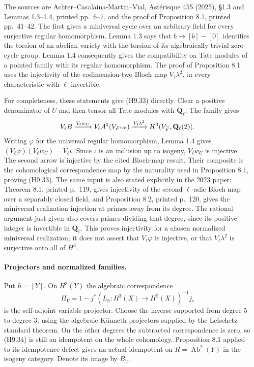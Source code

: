 \documentclass[11pt,a4paper]{article}
\begin{document}
The sources are Achter--Casalaina-Martin--Vial, Ast\'erisque 455 (2025),
\S1.3 and Lemmas 1.3--1.4, printed pp.~6--7, and the proof of
Proposition 8.1, printed pp.~41--42. The first gives a miniversal cycle
over an arbitrary field for every surjective regular homomorphism.
Lemma 1.3 says that $b\mapsto[b]-[0]$ identifies the torsion of an
abelian variety with the torsion of its algebraically trivial zero-cycle
group. Lemma 1.4 consequently gives the compatibility on Tate modules
of a pointed family with its regular homomorphism. The proof of
Proposition 8.1 uses the injectivity of the codimension-two Bloch map
$V_\ell\lambda^2$, in every characteristic with $\ell$ invertible.

For completeness, these statements give (H9.33) directly. Clear a
positive denominator of $U$ and then tensor all Tate modules with
$\mathbf Q_\ell$. The family gives
\[
 V_\ell B\xrightarrow{V_\ell w_U}
 V_\ell A^2(V_{F^{\rm sep}})
 \xrightarrow{V_\ell\lambda^2}
 H^3(V_{\overline F},\mathbf Q_\ell(2)).
\]
Writing $\varphi$ for the universal regular homomorphism,
Lemma 1.4 gives
$(V_\ell\varphi)(V_\ell w_U)=V_\ell\iota$.
Since $\iota$ is an inclusion up to isogeny, $V_\ell w_U$ is
injective. The second arrow is injective by the cited Bloch-map
result. Their composite is the cohomological correspondence map
by the naturality used in Proposition 8.1, proving (H9.33).
The same input is also stated explicitly in the 2023 paper:
Theorem 8.1, printed p.~119, gives injectivity of the second
$\ell$-adic Bloch map over a separably closed field, and Proposition
8.2, printed p.~120, gives the miniversal realization injection at
primes away from its degree. The rational argument just given also
covers primes dividing that degree, since its positive integer is
invertible in $\mathbf Q_\ell$.
This proves injectivity for a chosen normalized miniversal realization;
it does not assert that $V_\ell\varphi$ is injective, or that
$V_\ell\lambda^2$ is surjective onto all of $H^3$.

\paragraph{Projectors and normalized families.}
Put $h=[Y]$. On $H^3(Y)$ the algebraic correspondence
\[
 \Pi_V=1-j^*(L_h:H^3(X)\longrightarrow H^5(X))^{-1}j_*
                                                               \tag{H9.34}
\]
is the self-adjoint variable projector. Choose the inverse supported
from degree $5$ to degree $3$, using the algebraic K\"unneth
projectors supplied by the Lefschetz standard theorem. On the other
degrees the subtracted correspondence is zero, so (H9.34) is still
an idempotent on the whole cohomology. Proposition 8.1 applied to
its idempotence defect gives an actual idempotent on
$R=\operatorname{Ab}^2(Y)$ in the isogeny category. Denote its image
by $B_V$.
\end{document}
